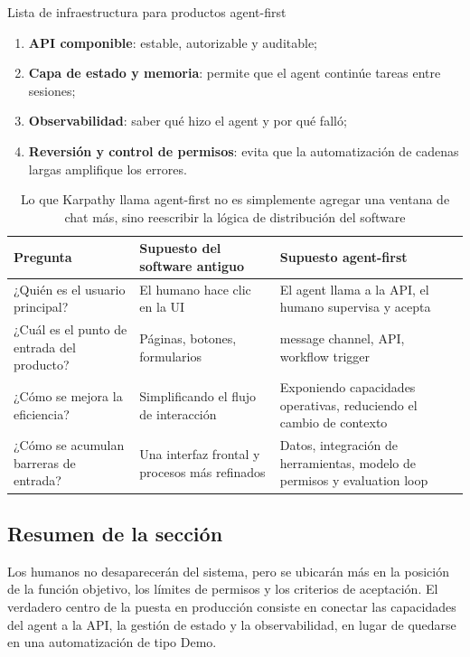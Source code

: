 \documentclass[a4paper]{article}
\begin{document}
\begin{knowledgebox}{Lista de infraestructura para productos agent-first}
\begin{enumerate}
    \item \textbf{API componible}: estable, autorizable y auditable;
    \item \textbf{Capa de estado y memoria}: permite que el agent continúe tareas entre sesiones;
    \item \textbf{Observabilidad}: saber qué hizo el agent y por qué falló;
    \item \textbf{Reversión y control de permisos}: evita que la automatización de cadenas largas amplifique los errores.
\end{enumerate}
\end{knowledgebox}

\begin{table}[H]
\centering
\begin{tabular}{p{3.0cm}p{4.1cm}p{4.8cm}}
\toprule
\textbf{Pregunta} & \textbf{Supuesto del software antiguo} & \textbf{Supuesto agent-first} \\
\midrule
¿Quién es el usuario principal? & El humano hace clic en la UI & El agent llama a la API, el humano supervisa y acepta \\
¿Cuál es el punto de entrada del producto? & Páginas, botones, formularios & message channel, API, workflow trigger \\
¿Cómo se mejora la eficiencia? & Simplificando el flujo de interacción & Exponiendo capacidades operativas, reduciendo el cambio de contexto \\
¿Cómo se acumulan barreras de entrada? & Una interfaz frontal y procesos más refinados & Datos, integración de herramientas, modelo de permisos y evaluation loop \\
\bottomrule
\end{tabular}
\caption{Lo que Karpathy llama agent-first no es simplemente agregar una ventana de chat más, sino reescribir la lógica de distribución del software}
\end{table}

\subsection{Resumen de la sección}
Los humanos no desaparecerán del sistema, pero se ubicarán más en la posición de la función objetivo, los límites de permisos y los criterios de aceptación. El verdadero centro de la puesta en producción consiste en conectar las capacidades del agent a la API, la gestión de estado y la observabilidad, en lugar de quedarse en una automatización de tipo Demo.
\end{document}
